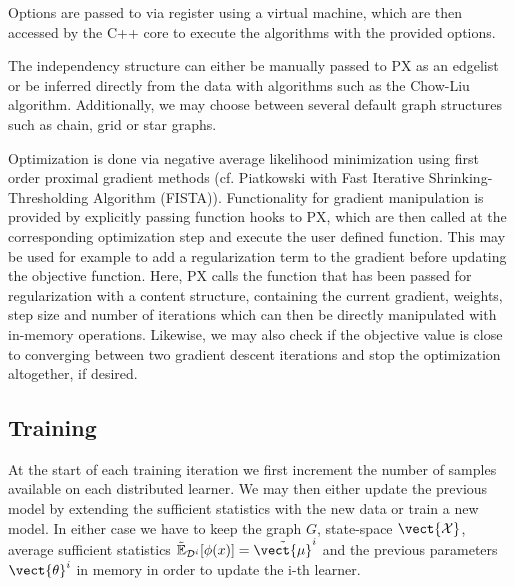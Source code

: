 Options are passed to via register using a virtual machine, which are then accessed by the C++ core to execute the algorithms with the provided options.

The independency structure can either be manually passed to PX as an edgelist or be inferred directly from the data with algorithms such as the Chow-Liu algorithm. 
Additionally, we may choose between several default graph structures such as chain, grid or star graphs.

Optimization is done via negative average likelihood minimization using first order proximal gradient methods (cf. Piatkowski \cite{piatkowski2018exponential} with Fast Iterative Shrinking-Thresholding Algorithm (FISTA)).
Functionality for gradient manipulation is provided by explicitly passing function hooks to PX, which are then called at the corresponding optimization step and execute the user defined function.
This may be used for example to add a regularization term to the gradient before updating the objective function. 
Here, PX calls the function that has been passed for regularization with a content structure, containing the current gradient, weights, step size and number of iterations which can then be directly manipulated with in-memory operations.
Likewise, we may also check if the objective value is close to converging between two gradient descent iterations and stop the optimization altogether, if desired.




\subsection{Training}
At the start of each training iteration we first increment the number of samples available on each distributed learner. 
We may then either update the previous model by extending the sufficient statistics with the new data or train a new model. 
In either case we  have to keep the graph $G$, state-space $\vect{\mathcal{X}}$, average sufficient statistics $\tilde{\mathbb{E}}_{\mathcal{D}^i}[\phi(x)] = \tilde{\vect{\mu}}^i$ and the previous parameters $\vect{\theta}^i$ in memory in order to update the i-th learner.

